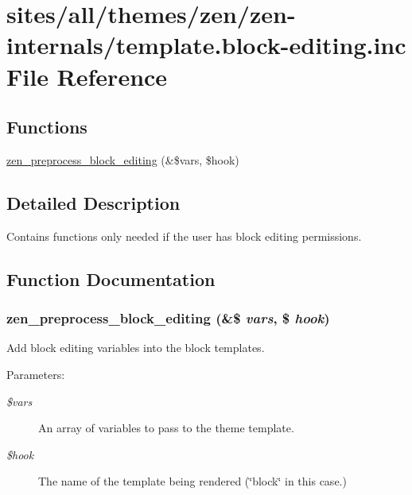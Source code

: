\hypertarget{template_8block-editing_8inc}{
\section{sites/all/themes/zen/zen-internals/template.block-editing.inc File Reference}
\label{template_8block-editing_8inc}
}
\subsection*{Functions}
\begin{CompactItemize}
\item 
\hyperlink{template_8block-editing_8inc_5fc3e809323c902040d6032b12ed3a6e}{zen\_\-preprocess\_\-block\_\-editing} (\&\$vars, \$hook)
\end{CompactItemize}


\subsection{Detailed Description}
Contains functions only needed if the user has block editing permissions. 

\subsection{Function Documentation}
\hypertarget{template_8block-editing_8inc_5fc3e809323c902040d6032b12ed3a6e}{
\subsubsection[{zen\_\-preprocess\_\-block\_\-editing}]{\setlength{\rightskip}{0pt plus 5cm}zen\_\-preprocess\_\-block\_\-editing (\&\$ {\em vars}, \/  \$ {\em hook})}}
\label{template_8block-editing_8inc_5fc3e809323c902040d6032b12ed3a6e}


Add block editing variables into the block templates.

\begin{Desc}
\item[Parameters:]
\begin{description}
\item[{\em \$vars}]An array of variables to pass to the theme template. \item[{\em \$hook}]The name of the template being rendered (\char`\"{}block\char`\"{} in this case.) \end{description}
\end{Desc}
